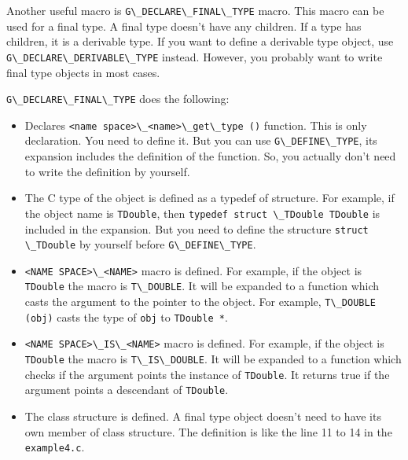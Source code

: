 Another useful macro is
\passthrough{\lstinline!G\_DECLARE\_FINAL\_TYPE!} macro. This macro can
be used for a final type. A final type doesn't have any children. If a
type has children, it is a derivable type. If you want to define a
derivable type object, use
\passthrough{\lstinline!G\_DECLARE\_DERIVABLE\_TYPE!} instead. However,
you probably want to write final type objects in most cases.

\passthrough{\lstinline!G\_DECLARE\_FINAL\_TYPE!} does the following:

\begin{itemize}
\tightlist
\item
  Declares \passthrough{\lstinline!<name space>\_<name>\_get\_type ()!}
  function. This is only declaration. You need to define it. But you can
  use \passthrough{\lstinline!G\_DEFINE\_TYPE!}, its expansion includes
  the definition of the function. So, you actually don't need to write
  the definition by yourself.
\item
  The C type of the object is defined as a typedef of structure. For
  example, if the object name is \passthrough{\lstinline!TDouble!}, then
  \passthrough{\lstinline!typedef struct \_TDouble TDouble!} is included
  in the expansion. But you need to define the structure
  \passthrough{\lstinline!struct \_TDouble!} by yourself before
  \passthrough{\lstinline!G\_DEFINE\_TYPE!}.
\item
  \passthrough{\lstinline!<NAME SPACE>\_<NAME>!} macro is defined. For
  example, if the object is \passthrough{\lstinline!TDouble!} the macro
  is \passthrough{\lstinline!T\_DOUBLE!}. It will be expanded to a
  function which casts the argument to the pointer to the object. For
  example, \passthrough{\lstinline!T\_DOUBLE (obj)!} casts the type of
  \passthrough{\lstinline!obj!} to \passthrough{\lstinline!TDouble *!}.
\item
  \passthrough{\lstinline!<NAME SPACE>\_IS\_<NAME>!} macro is defined.
  For example, if the object is \passthrough{\lstinline!TDouble!} the
  macro is \passthrough{\lstinline!T\_IS\_DOUBLE!}. It will be expanded
  to a function which checks if the argument points the instance of
  \passthrough{\lstinline!TDouble!}. It returns true if the argument
  points a descendant of \passthrough{\lstinline!TDouble!}.
\item
  The class structure is defined. A final type object doesn't need to
  have its own member of class structure. The definition is like the
  line 11 to 14 in the \passthrough{\lstinline!example4.c!}.
\end{itemize}

